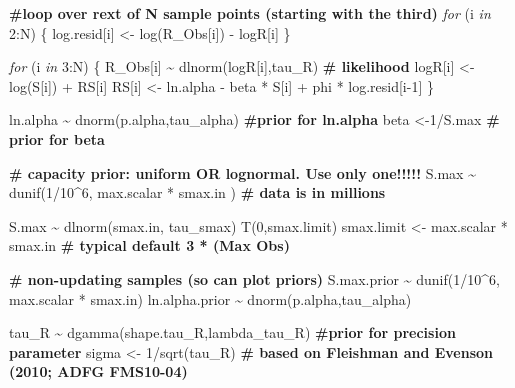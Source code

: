 \documentclass[french,11pt]{book}
\newenvironment{Shaded}{\begin{snugshade}}{\end{snugshade}}
\newcommand{\CommentTok}[1]{\textcolor[rgb]{0.56,0.35,0.01}{\textbf{#1}}}
\newcommand{\ControlFlowTok}[1]{\textcolor[rgb]{0.13,0.29,0.53}{\textit{#1}}}
\newcommand{\DecValTok}[1]{\textcolor[rgb]{0.00,0.00,0.81}{#1}}
\newcommand{\FunctionTok}[1]{\textcolor[rgb]{0.00,0.00,0.00}{#1}}
\newcommand{\NormalTok}[1]{#1}
\newcommand{\OtherTok}[1]{\textcolor[rgb]{0.56,0.35,0.01}{#1}}
\newcommand{\SpecialCharTok}[1]{\textcolor[rgb]{0.00,0.00,0.00}{#1}}
\begin{document}
\begin{Shaded}
\begin{Highlighting}[]
\CommentTok{\#loop over rext of N sample points (starting with the third)    }
\ControlFlowTok{for}\NormalTok{ (i }\ControlFlowTok{in} \DecValTok{2}\SpecialCharTok{:}\NormalTok{N) \{ }
\NormalTok{log.resid[i] }\OtherTok{\textless{}{-}}  \FunctionTok{log}\NormalTok{(R\_Obs[i]) }\SpecialCharTok{{-}}\NormalTok{ logR[i] }
\NormalTok{\}}

\ControlFlowTok{for}\NormalTok{ (i }\ControlFlowTok{in} \DecValTok{3}\SpecialCharTok{:}\NormalTok{N) \{       }
\NormalTok{R\_Obs[i] }\SpecialCharTok{\textasciitilde{}} \FunctionTok{dlnorm}\NormalTok{(logR[i],tau\_R)  }\CommentTok{\# likelihood }
\NormalTok{logR[i] }\OtherTok{\textless{}{-}} \FunctionTok{log}\NormalTok{(S[i]) }\SpecialCharTok{+}\NormalTok{ RS[i]      }
\NormalTok{RS[i] }\OtherTok{\textless{}{-}}\NormalTok{ ln.alpha }\SpecialCharTok{{-}}\NormalTok{ beta }\SpecialCharTok{*}\NormalTok{ S[i] }\SpecialCharTok{+}\NormalTok{ phi }\SpecialCharTok{*}\NormalTok{ log.resid[i}\DecValTok{{-}1}\NormalTok{] }
\NormalTok{\} }

\NormalTok{ln.alpha }\SpecialCharTok{\textasciitilde{}} \FunctionTok{dnorm}\NormalTok{(p.alpha,tau\_alpha)            }\CommentTok{\#prior for ln.alpha     }
\NormalTok{beta }\OtherTok{\textless{}{-}}\DecValTok{1}\SpecialCharTok{/}\NormalTok{S.max    }\CommentTok{\# prior for beta     }

\CommentTok{\# capacity prior: uniform OR lognormal. Use only one!!!!!}
\NormalTok{S.max }\SpecialCharTok{\textasciitilde{}} \FunctionTok{dunif}\NormalTok{(}\DecValTok{1}\SpecialCharTok{/}\DecValTok{10}\SpecialCharTok{\^{}}\DecValTok{6}\NormalTok{, max.scalar }\SpecialCharTok{*}\NormalTok{ smax.in )  }\CommentTok{\# data is in millions}

\NormalTok{S.max }\SpecialCharTok{\textasciitilde{}} \FunctionTok{dlnorm}\NormalTok{(smax.in, tau\_smax) }\FunctionTok{T}\NormalTok{(}\DecValTok{0}\NormalTok{,smax.limit)}
\NormalTok{smax.limit }\OtherTok{\textless{}{-}}\NormalTok{ max.scalar }\SpecialCharTok{*}\NormalTok{ smax.in }\CommentTok{\# typical default  3 * (Max Obs)}
    
\CommentTok{\# non{-}updating samples (so can plot priors)}
\NormalTok{S.max.prior }\SpecialCharTok{\textasciitilde{}} \FunctionTok{dunif}\NormalTok{(}\DecValTok{1}\SpecialCharTok{/}\DecValTok{10}\SpecialCharTok{\^{}}\DecValTok{6}\NormalTok{, max.scalar }\SpecialCharTok{*}\NormalTok{ smax.in)}
\NormalTok{ln.alpha.prior }\SpecialCharTok{\textasciitilde{}} \FunctionTok{dnorm}\NormalTok{(p.alpha,tau\_alpha)}

\NormalTok{tau\_R }\SpecialCharTok{\textasciitilde{}} \FunctionTok{dgamma}\NormalTok{(shape.tau\_R,lambda\_tau\_R)    }\CommentTok{\#prior for precision parameter     }
\NormalTok{sigma }\OtherTok{\textless{}{-}} \DecValTok{1}\SpecialCharTok{/}\FunctionTok{sqrt}\NormalTok{(tau\_R)   }\CommentTok{\# based on Fleishman and Evenson (2010; ADFG FMS10{-}04)}


\end{Highlighting}
\end{Shaded}
\end{document}

